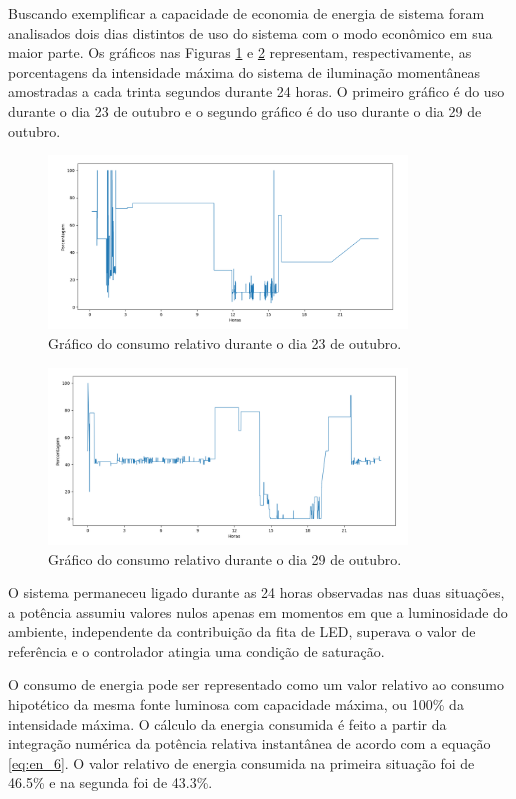 Buscando exemplificar a capacidade de economia de energia de sistema foram analisados dois dias distintos de uso do sistema com o modo econômico em sua maior parte. Os gráficos nas Figuras \ref{gren1} e \ref{gren2} representam, respectivamente, as porcentagens da intensidade máxima do sistema de iluminação momentâneas amostradas a cada trinta segundos durante 24 horas. O primeiro gráfico é do uso durante o dia 23 de outubro e o segundo gráfico é do uso durante o dia 29 de outubro.
\begin{figure}[htb]
    \begin{center}
    \includegraphics[width=0.85\textwidth]{figuras/gren1.PNG}
    \end{center}
    \caption[Gráfico do consumo relativo durante o dia 23 de outubro.]{Gráfico do consumo relativo durante o dia 23 de outubro.}
    \label{gren1}
\end{figure}
\begin{figure}[htb]
    \begin{center}
    \includegraphics[width=0.85\textwidth]{figuras/gren2.PNG}
    \end{center}
    \caption[Gráfico do consumo relativo durante o dia 29 de outubro.]{Gráfico do consumo relativo durante o dia 29 de outubro.}
    \label{gren2}
\end{figure}

O sistema permaneceu ligado durante as 24 horas observadas nas duas situações, a potência assumiu valores nulos apenas em momentos em que a luminosidade do ambiente, independente da contribuição da fita de LED, superava o valor de referência e o controlador atingia uma condição de saturação. 

O consumo de energia pode ser representado como um valor relativo ao consumo hipotético da mesma fonte luminosa com capacidade máxima, ou 100\% da intensidade máxima. O cálculo da energia consumida é feito a partir da integração numérica da potência relativa instantânea de acordo com a equação \eqref{eq:en_6}. O valor relativo de energia consumida na primeira situação foi de 46.5\% e na segunda foi de 43.3\%. 
